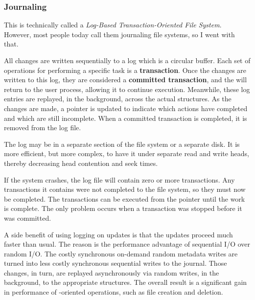 \subsubsection{Journaling}\label{subsubsec:Journaling}
This is technically called a \emph{Log-Based Transaction-Oriented File System}.
However, most people today call them journaling file systems, so I went with that.

All  changes are written sequentially to a log which is a circular buffer.
Each set of operations for performing a specific task is a \textbf{transaction}.
Once the changes are written to this log, they are considered a \textbf{committed transaction}, and the  will return to the user process, allowing it to continue execution.
Meanwhile, these log entries are replayed, in the background, across the actual  structures.
As the changes are made, a pointer is updated to indicate which actions have completed and which are still incomplete.
When a committed transaction is completed, it is removed from the log file.

The log may be in a separate section of the file system or a separate disk.
It is more efficient, but more complex, to have it under separate read and write heads, thereby decreasing head contention and seek times.

If the system crashes, the log file will contain zero or more transactions.
Any transactions it contains were not completed to the file system, so they must now be completed.
The transactions can be executed from the pointer until the work is complete.
The only problem occurs when a transaction was stopped before it was committed.

A side benefit of using logging on  updates is that the updates proceed much faster than usual.
The reason is the performance advantage of sequential I/O over random I/O.
The costly synchronous on-demand random metadata writes are turned into less costly synchronous sequential writes to the journal.
Those changes, in turn, are replayed asynchronously via random writes, in the background, to the appropriate structures.
The overall result is a significant gain in performance of -oriented operations, such as file creation and deletion.


